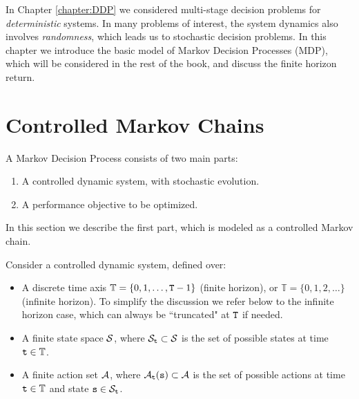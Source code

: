
In  Chapter \ref{chapter:DDP} we considered multi-stage decision
problems for \emph{deterministic} systems. In many problems of
interest, the system dynamics also involves \emph{randomness}, which
leads us to stochastic decision problems. In this chapter we
introduce the basic model of Markov Decision Processes (MDP), which
will be considered in the rest of the book, and discuss the finite
horizon return.



\section{Controlled Markov Chains}

A Markov Decision Process consists of two main parts:
\begin{enumerate}
  \item A controlled dynamic system, with stochastic evolution.
  \item A performance objective to be optimized.
\end{enumerate}
In this section we describe the first part, which is modeled as a controlled Markov chain.

Consider a controlled dynamic system, defined over:
\begin{itemize}
  \item A discrete time axis ${\mathbb{T}} = \{ 0,1, \ldots ,{\tt T} - 1\} $  (finite horizon), or
  ${\mathbb{T}} = \{ 0,1,2, \ldots \} $ (infinite horizon).
To simplify the discussion we refer below to the infinite horizon
case, which can always be ``truncated" at ${\tt T}$ if needed.
  \item A finite state space $\mathcal{S}$, where ${\mathcal{S}_{\tt t}} \subset \mathcal{S}$ is the set of possible states at time ${\tt t}\in {\mathbb{T}}$.
  \item A finite action set $\mathcal{A}$, where ${\mathcal{A}_{\tt t}}({\tt s}) \subset \mathcal{A}$ is the set of possible actions at time ${\tt t}\in {\mathbb{T}}$ and state ${\tt s} \in {\mathcal{S}_{\tt t}}$.
\end{itemize}

